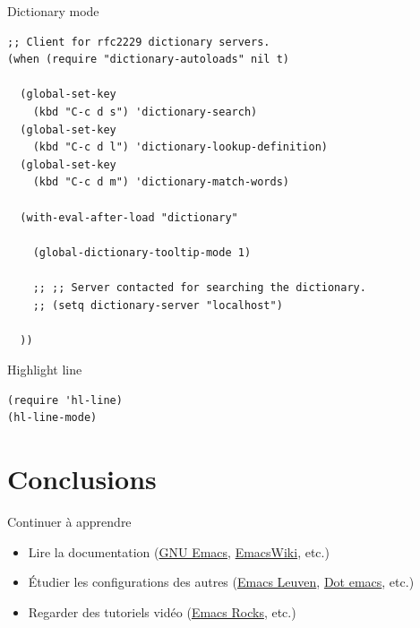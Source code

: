 \documentclass[t]{beamer}
\begin{document}
\begin{frame}[fragile,label={sec:orgfecf1f6}]{Dictionary mode}
 \lstset{language=Lisp,label= ,caption= ,captionpos=b,numbers=none}
\begin{lstlisting}
;; Client for rfc2229 dictionary servers.
(when (require "dictionary-autoloads" nil t)

  (global-set-key
    (kbd "C-c d s") 'dictionary-search)
  (global-set-key
    (kbd "C-c d l") 'dictionary-lookup-definition)
  (global-set-key
    (kbd "C-c d m") 'dictionary-match-words)

  (with-eval-after-load "dictionary"

    (global-dictionary-tooltip-mode 1)

    ;; ;; Server contacted for searching the dictionary.
    ;; (setq dictionary-server "localhost")

  ))
\end{lstlisting}
\end{frame}

\begin{frame}[fragile,label={sec:orgf320e7c}]{Highlight line}
 \lstset{language=Lisp,label= ,caption= ,captionpos=b,numbers=none}
\begin{lstlisting}
(require 'hl-line)
(hl-line-mode)
\end{lstlisting}
\end{frame}

\section{Conclusions}
\label{sec:org88719da}

\begin{frame}[label={sec:org31e8e8b}]{Continuer à apprendre}
\begin{itemize}
\item Lire la documentation (\href{http://www.gnu.org/software/emacs/}{GNU Emacs}, \href{http://www.emacswiki.org/}{EmacsWiki}, etc.)
\item Étudier les configurations des autres (\href{https://github.com/fniessen/emacs-leuven}{Emacs Leuven}, \href{http://www.dotemacs.de/}{Dot emacs}, etc.)
\item Regarder des tutoriels vidéo (\href{http://www.emacsrocks.com/}{Emacs Rocks}, etc.)
\end{itemize}
\end{frame}
\end{document}
